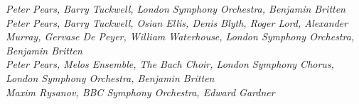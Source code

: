   \textit{Peter Pears, Barry Tuckwell, London Symphony Orchestra, Benjamin Britten}\marginnote{} \\ 
 \textit{Peter Pears, Barry Tuckwell, Osian Ellis, Denis Blyth, Roger Lord, Alexander Murray, Gervase De Peyer, William Waterhouse, London Symphony Orchestra, Benjamin Britten}\marginnote{} \\  
  \textit{Peter Pears, Melos Ensemble, The Bach Choir, London Symphony Chorus, London Symphony Orchestra, Benjamin Britten}\marginnote{} \\ 
  \textit{Maxim Rysanov, BBC Symphony Orchestra, Edward Gardner}\marginnote{} \\


